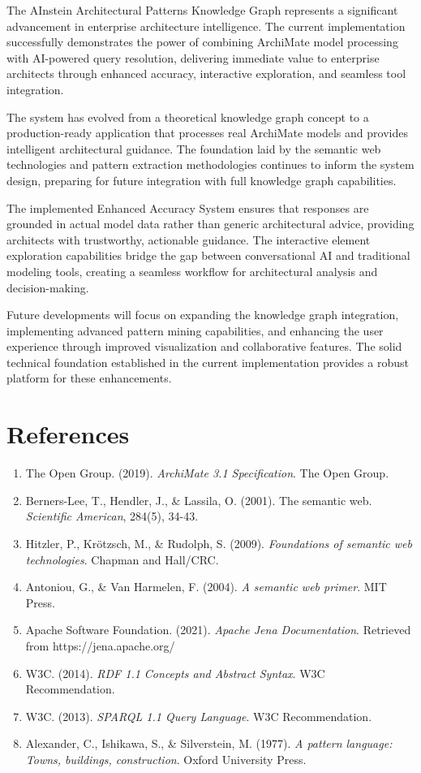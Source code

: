 \documentclass[12pt,a4paper]{article}
\begin{document}
The AInstein Architectural Patterns Knowledge Graph represents a significant advancement in enterprise architecture intelligence. The current implementation successfully demonstrates the power of combining ArchiMate model processing with AI-powered query resolution, delivering immediate value to enterprise architects through enhanced accuracy, interactive exploration, and seamless tool integration.

The system has evolved from a theoretical knowledge graph concept to a production-ready application that processes real ArchiMate models and provides intelligent architectural guidance. The foundation laid by the semantic web technologies and pattern extraction methodologies continues to inform the system design, preparing for future integration with full knowledge graph capabilities.

The implemented Enhanced Accuracy System ensures that responses are grounded in actual model data rather than generic architectural advice, providing architects with trustworthy, actionable guidance. The interactive element exploration capabilities bridge the gap between conversational AI and traditional modeling tools, creating a seamless workflow for architectural analysis and decision-making.

Future developments will focus on expanding the knowledge graph integration, implementing advanced pattern mining capabilities, and enhancing the user experience through improved visualization and collaborative features. The solid technical foundation established in the current implementation provides a robust platform for these enhancements.

\section*{References}

\begin{enumerate}
    \item The Open Group. (2019). \textit{ArchiMate 3.1 Specification}. The Open Group.
    \item Berners-Lee, T., Hendler, J., \& Lassila, O. (2001). The semantic web. \textit{Scientific American}, 284(5), 34-43.
    \item Hitzler, P., Kr\"{o}tzsch, M., \& Rudolph, S. (2009). \textit{Foundations of semantic web technologies}. Chapman and Hall/CRC.
    \item Antoniou, G., \& Van Harmelen, F. (2004). \textit{A semantic web primer}. MIT Press.
    \item Apache Software Foundation. (2021). \textit{Apache Jena Documentation}. Retrieved from https://jena.apache.org/
    \item W3C. (2014). \textit{RDF 1.1 Concepts and Abstract Syntax}. W3C Recommendation.
    \item W3C. (2013). \textit{SPARQL 1.1 Query Language}. W3C Recommendation.
    \item Alexander, C., Ishikawa, S., \& Silverstein, M. (1977). \textit{A pattern language: Towns, buildings, construction}. Oxford University Press.
\end{enumerate}
\end{document}

